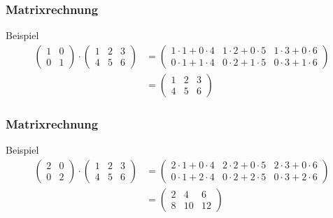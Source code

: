 \documentclass{beamer}
\newcommand{\mytitle}{Matrixrechnung}
\begin{document}
\begin{frame}\frametitle{\mytitle}
	\begin{block}{Beispiel}
		\begin{align*}
			\begin{pmatrix} 1&0\\0&1\end{pmatrix}\cdot	
			\begin{pmatrix} 1&2&3\\4&5&6\end{pmatrix}
							 &=
			\begin{pmatrix} 1\cdot 1+0\cdot 4&1\cdot 2+0\cdot 5&1\cdot 3+0\cdot 6\\0\cdot 1+1\cdot 4&0\cdot 2+1\cdot 5&0\cdot 3+1\cdot 6\end{pmatrix}\\
											 &= \begin{pmatrix} 1&2&3\\4&5&6\end{pmatrix}
		\end{align*}
	\end{block}
\end{frame}

\begin{frame}\frametitle{\mytitle}
	\begin{block}{Beispiel}
		\begin{align*}
			\begin{pmatrix} 2&0\\0&2\end{pmatrix}\cdot	
			\begin{pmatrix} 1&2&3\\4&5&6\end{pmatrix}
							 &=
			\begin{pmatrix} 2\cdot 1+0\cdot 4&2\cdot 2+0\cdot 5&2\cdot 3+0\cdot 6\\0\cdot 1+2\cdot 4&0\cdot 2+2\cdot 5&0\cdot 3+2\cdot 6\end{pmatrix}\\
											 &= \begin{pmatrix} 2&4&6\\8&10&12\end{pmatrix}
		\end{align*}
	\end{block}
\end{frame}
\end{document}
